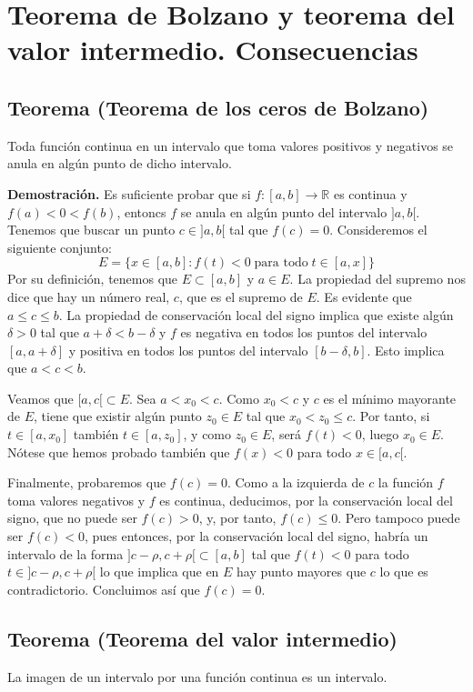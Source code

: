 \documentclass[10pt,a4paper]{article}
\begin{document}
	\section{Teorema de Bolzano y teorema del valor intermedio. Consecuencias}
	
	\subsection{Teorema (Teorema de los ceros de Bolzano)}
	Toda función continua en un intervalo que toma valores positivos y negativos se anula en algún punto de dicho intervalo.
	
	\textbf{Demostración. }Es suficiente probar que si $f : [a, b] \rightarrow \mathbb{R}$ es continua y $f(a) < 0 < f(b)$, entoncs $f$ se anula en algún punto del intervalo $]a, b[$. Tenemos que buscar un punto $c \in ]a, b[$ tal que $f(c) = 0$. Consideremos el siguiente conjunto:
	$$E = \{x \in [a, b] : f(t) < 0 \; \text{para todo} \; t \in [a, x]\}$$
	Por su definición, tenemos que $E \subset [a, b]$ y $a \in E$. La propiedad del supremo nos dice que hay un número real, $c$, que es el supremo de $E$. Es evidente que $a \leq c \leq b$. La propiedad de conservación local del signo implica que existe algún $\delta > 0$ tal que $a + \delta < b - \delta$ y $f$ es negativa en todos los puntos del intervalo $[a, a + \delta]$ y positiva en todos los puntos del intervalo $[b - \delta, b]$. Esto implica que $a < c < b$.
	
	Veamos que $[a, c[ \subset E$. Sea $a < x_0 < c$. Como $x_0 < c$ y $c$ es el mínimo mayorante de $E$, tiene que existir algún punto $z_0 \in E$ tal que $x_0 < z_0 \leq c$. Por tanto, si $t \in [a, x_0]$ también $t \in [a, z_0]$, y como $z_0 \in E$, será $f(t) < 0$, luego $x_0 \in E$. Nótese que hemos probado también que $f(x) < 0$ para todo $x \in [a, c[$.
	
	Finalmente, probaremos que $f(c) = 0$. Como a la izquierda de $c$ la función $f$ toma valores negativos y $f$ es continua, deducimos, por la conservación local del signo, que no puede ser $f(c) > 0$, y, por tanto, $f(c) \leq 0$. Pero tampoco puede ser $f(c) < 0$, pues entonces, por la conservación local del signo, habría un intervalo de la forma $]c - \rho, c + \rho[ \subset [a, b]$ tal que $f(t) < 0$ para todo $t \in ]c - \rho, c + \rho[$ lo que implica que en $E$ hay punto mayores que $c$ lo que es contradictorio. Concluimos así que $f(c) = 0$.
	
	\subsection{Teorema (Teorema del valor intermedio)}
	La imagen de un intervalo por una función continua es un intervalo.
	
\end{document}
